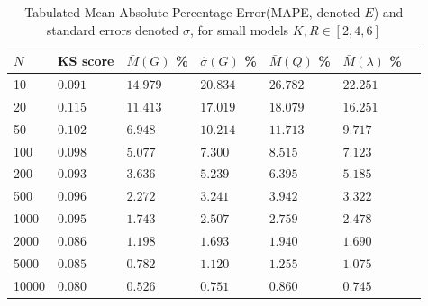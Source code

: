\begin{table}[H] 
\begin{center}
\begin{tabular}{@{}lllllll@{}}
\toprule
    \(N\) & KS score & \(\bar{M}(G)\) \% & \(\hat{\sigma}(G)\) \% & \(\bar{M}(Q)\) \% & \(\bar{M}(\lambda)\) \% \\  \midrule
    10 &\(0.091\) & \(14.979\) & \(20.834\) & \(26.782\) & \(22.251\) &  \\ 
    20 &\(0.115\) & \(11.413\) & \(17.019\) & \(18.079\) & \(16.251\) &  \\ 
    50 &\(0.102\) & \(6.948\) & \(10.214\) & \(11.713\) & \(9.717\) &  \\ 
    100 &\(0.098\) & \(5.077\) & \(7.300\) & \(8.515\) & \(7.123\) &  \\ 
    200 &\(0.093\) & \(3.636\) & \(5.239\) & \(6.395\) & \(5.185\) &  \\ 
    500 &\(0.096\) & \(2.272\) & \(3.241\) & \(3.942\) & \(3.322\) &  \\ 
    1000 &\(0.095\) & \(1.743\) & \(2.507\) & \(2.759\) & \(2.478\) &  \\ 
    2000 &\(0.086\) & \(1.198\) & \(1.693\) & \(1.940\) & \(1.690\) &  \\ 
    5000 &\(0.085\) & \(0.782\) & \(1.120\) & \(1.255\) & \(1.075\) &  \\ 
    10000 &\(0.080\) & \(0.526\) & \(0.751\) & \(0.860\) & \(0.745\) &  \\     \bottomrule
\end{tabular}
\end{center}
\caption{Tabulated Mean Absolute Percentage Error(MAPE, denoted \(E\)) and standard errors denoted \(\sigma\), for small models \(K,R \in [2,4,6]\)}
\label{tab:convergence_tabulated_errors}
\end{table} 

